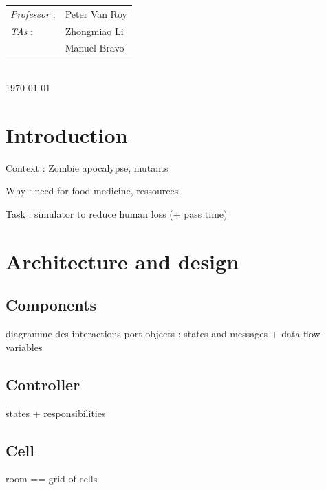 \documentclass[12pt,a4paper]{article}
\begin{document}
\begin{titlepage}
\normalsize
{\begin{tabular}{ll}
\textit{Professor}  : & Peter Van Roy \\
\textit{TAs} 		: & Zhongmiao Li \\
					  & Manuel Bravo \\
\end{tabular}}
\\[1cm]


{\normalsize \today} %

\newpage

\end{titlepage}




\section*{Introduction}
Context : Zombie apocalypse, mutants

Why : need for food medicine, ressources

Task : simulator to reduce human loss (+ pass time)

\section{Architecture and design}
\subsection{Components}
diagramme des interactions
port objects : states and messages + data flow variables

\subsection{Controller}
states + responsibilities

\subsection{Cell}
room == grid of cells
\end{document}
